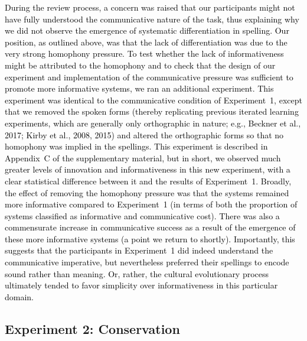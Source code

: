 \documentclass[doc,biblatex]{apa7}
\newcommand\newmaterial[1]{\textcolor{black}{#1}}
\newcommand\secondrevision[1]{\textcolor{black}{#1}}
\begin{document}
\newmaterial{During the review process, a concern was raised that our participants might not have fully understood the communicative nature of the task, thus explaining why we did not observe the emergence of systematic differentiation in spelling. Our position, as outlined above, was that the lack of differentiation was due to the very strong homophony pressure. To test whether the lack of informativeness might be attributed to the homophony and to check that the design of our experiment and implementation of the communicative pressure was sufficient to promote more informative systems, we ran an additional experiment. This experiment was identical to the communicative condition of Experiment~1, except that we removed the spoken forms (thereby replicating previous iterated learning experiments, which are generally only orthographic in nature; e.g., Beckner et al., 2017; Kirby et al., 2008, 2015) and altered the orthographic forms so that no homophony was implied in the spellings. This experiment is described in Appendix~C of the supplementary material, but in short, we observed much greater levels of innovation and informativeness \secondrevision{in this new experiment, with a clear statistical difference between it and the results of Experiment~1. Broadly, the effect of removing the homophony pressure was that the systems remained more informative compared to Experiment~1 (in terms of both the proportion of systems classified as informative and communicative cost).} There was also a commensurate increase in communicative success as a result of the emergence of these more informative systems (a point we return to shortly). Importantly, this suggests that the participants in Experiment~1 did indeed understand the communicative imperative, but nevertheless preferred their spellings to encode sound rather than meaning. Or, rather, the cultural evolutionary process ultimately tended to favor simplicity over informativeness in this particular domain.}

\subsection{Experiment 2: Conservation}
\end{document}
